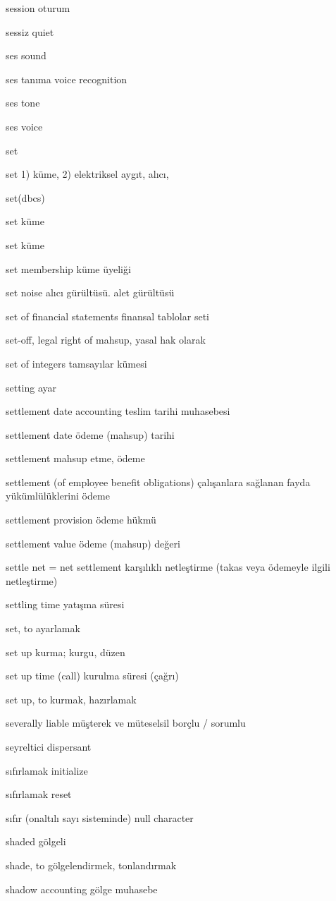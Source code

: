 \documentclass[12pt,fleqn]{article}\usepackage{../../common}
\begin{document}
session oturum

sessiz quiet

ses sound

ses tanıma voice recognition

ses tone

ses voice

set

set 1) küme, 2) elektriksel aygıt, alıcı,

set(dbcs)

set küme

set küme

set membership küme üyeliği

set noise alıcı gürültüsü. alet gürültüsü

set of financial statements finansal tablolar seti

set-off, legal right of mahsup, yasal hak olarak

set of integers tamsayılar kümesi

setting ayar

settlement date accounting teslim tarihi muhasebesi

settlement date ödeme (mahsup) tarihi

settlement mahsup etme, ödeme

settlement (of employee benefit obligations) çalışanlara sağlanan fayda yükümlülüklerini ödeme

settlement provision ödeme hükmü

settlement value ödeme (mahsup) değeri

settle net = net settlement karşılıklı netleştirme (takas veya ödemeyle ilgili netleştirme)

settling time yatışma süresi

set, to ayarlamak

set up kurma; kurgu, düzen

set up time (call) kurulma süresi (çağrı)

set up, to kurmak, hazırlamak

severally liable müşterek ve müteselsil borçlu / sorumlu

seyreltici dispersant

sıfırlamak initialize

sıfırlamak reset

sıfır (onaltılı sayı sisteminde) null character

shaded gölgeli

shade, to gölgelendirmek, tonlandırmak

shadow accounting gölge muhasebe
\end{document}
